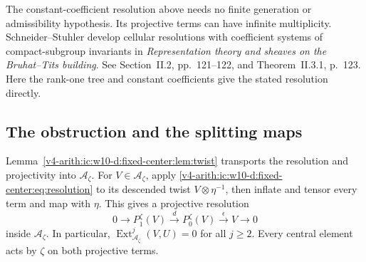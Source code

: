 The constant-coefficient resolution above needs no finite generation or admissibility hypothesis.
Its projective terms can have infinite multiplicity.
Schneider--Stuhler develop cellular resolutions with coefficient
systems of compact-subgroup invariants in
\emph{Representation theory and sheaves on the Bruhat--Tits building}.
See Section~II.2, pp.~121--122, and Theorem~II.3.1, p.~123.
Here the rank-one tree and constant coefficients give the stated resolution directly.

\subsection{The obstruction and the splitting maps}

Lemma~\ref{v4-arith:ic:w10-d:fixed-center:lem:twist} transports the resolution and projectivity into $\mathcal A_\zeta$.
For $V\in\mathcal A_\zeta$, apply \eqref{v4-arith:ic:w10-d:fixed-center:eq:resolution} to its descended twist $V\otimes\eta^{-1}$,
then inflate and tensor every term and map with $\eta$.
This gives a projective resolution
\[
 0\longrightarrow P_1^\zeta(V)\xrightarrow{d}P_0^\zeta(V)
 \xrightarrow{\epsilon}V\longrightarrow0
\]
inside $\mathcal A_\zeta$.
In particular, $\operatorname{Ext}^j_{\mathcal A_\zeta}(V,U)=0$ for all $j\ge2$.
Every central element acts by $\zeta$ on both projective terms.

